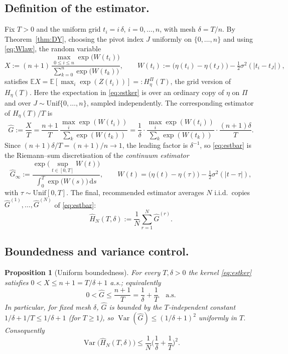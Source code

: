 \documentclass{amsart}
\newtheorem{proposition}{Proposition}
\theoremstyle{definition}
\DeclareMathOperator{\Var}{Var}
\newcommand{\E}{\mathbb{E}}
\newcommand{\dd}{\,\mathrm{d}}
\begin{document}
\subsection{Definition of the estimator.}
Fix $T>0$ and the uniform grid $t_i=i\,\delta$, $i=0,\dots,n$, with mesh
$\delta=T/n$. By Theorem~\ref{thm:DY}, choosing the pivot index $J$ uniformly on
$\{0,\dots,n\}$ and using \eqref{eq:Wlaw}, the random variable
\begin{equation}\label{eq:estker}
   X:=(n+1)\,
   \frac{\displaystyle\max_{0\le i\le n}\exp\!\big(W(t_i)\big)}
        {\displaystyle\sum_{k=0}^{n}\exp\!\big(W(t_k)\big)},\qquad
   W(t_i):=\big(\eta(t_i)-\eta(t_J)\big)-\tfrac12\sigma^2(|t_i-t_J|),
\end{equation}
satisfies $\E X=\E[\max_i\exp(Z(t_i))]=:H_\eta^{\Pi}(T)$, the grid version of
$H_\eta(T)$. Here the expectation in \eqref{eq:estker} is over an ordinary copy of
$\eta$ on $\Pi$ and over $J\sim\mathrm{Unif}\{0,\dots,n\}$, sampled independently.
The corresponding estimator of $H_\eta(T)/T$ is
\begin{equation}\label{eq:estbar}
   \widehat G:=\frac{X}{T}
   =\frac{n+1}{T}\,
   \frac{\displaystyle\max_{i}\exp(W(t_i))}{\displaystyle\sum_{k}\exp(W(t_k))}
   =\frac{1}{\delta}\cdot
   \frac{\displaystyle\max_{i}\exp(W(t_i))}{\displaystyle\sum_{k}\exp(W(t_k))}
   \cdot\frac{(n+1)\delta}{T}.
\end{equation}
Since $(n+1)\delta/T=(n+1)/n\to1$, the leading factor is $\delta^{-1}$, so
\eqref{eq:estbar} is the Riemann--sum discretisation of the \emph{continuum
estimator}
\begin{equation}\label{eq:contest}
   \widehat G_\infty
   :=\frac{\exp\!\big(\sup_{t\in[0,T]}W(t)\big)}{\displaystyle\int_0^{T}\exp\!\big(W(s)\big)\dd s},
   \qquad
   W(t)=\big(\eta(t)-\eta(\tau)\big)-\tfrac12\sigma^2(|t-\tau|),
\end{equation}
with $\tau\sim\mathrm{Unif}[0,T]$. The final, recommended estimator averages
$N$ i.i.d.\ copies $\widehat G^{(1)},\dots,\widehat G^{(N)}$ of \eqref{eq:estbar}:
\begin{equation}\label{eq:final}
   \widehat H_{N}(T,\delta):=\frac1N\sum_{r=1}^{N}\widehat G^{(r)}.
\end{equation}

\subsection{Boundedness and variance control.}

\begin{proposition}[Uniform boundedness]\label{prop:bdd}
For every $T,\delta>0$ the kernel \eqref{eq:estker} satisfies
$0<X\le n+1=T/\delta+1$ a.s.; equivalently
\[
   0<\widehat G\le \frac{n+1}{T}=\frac1\delta+\frac1T\quad\text{a.s.}
\]
In particular, for fixed mesh $\delta$, $\widehat G$ is bounded by the
$T$-independent constant $1/\delta+1/T\le 1/\delta+1$ \textup{(}for $T\ge1$\textup{)},
so $\Var(\widehat G)\le(1/\delta+1)^2$ uniformly in $T$. Consequently
\begin{equation}\label{eq:varN}
   \Var\big(\widehat H_N(T,\delta)\big)\le\frac{1}{N}\Big(\frac1\delta+\frac1T\Big)^2 .
\end{equation}
\end{proposition}
\end{document}
